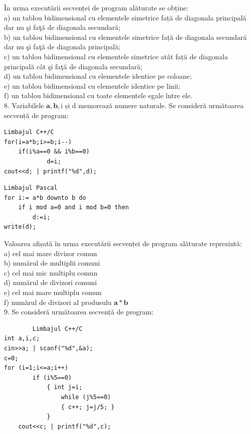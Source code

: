 \documentclass[10pt]{article}
\begin{document}
În urma executării secvenței de program alăturate se obține:\\
a) un tablou bidimensional cu elementele simetrice față de diagonala principală dar nu şi faţă de diagonala secundară;\\
b) un tablou bidimensional cu elementele simetrice față de diagonala secundară dar nu şi faţă de diagonala principală;\\
c) un tablou bidimensional cu elementele simetrice atât față de diagonala principală cât şi faţă de diagonala secundară;\\
d) un tablou bidimensional cu elementele identice pe coloane;\\
e) un tablou bidimensional cu elementele identice pe linii;\\
f) un tablou bidimensional cu toate elementele egale între ele.\\
8. Variabilele $\mathbf{a}, \mathbf{b}, \mathrm{i}$ și d memorează numere naturale. Se consideră următoarea secvență de program:

\begin{verbatim}
Limbajul C++/C
for(i=a*b;i>=b;i--)
    if(i%a==0 && i%b==0)
            d=i;
cout<<d; | printf("%d",d);
\end{verbatim}

\begin{verbatim}
Limbajul Pascal
for i:= a*b downto b do
    if i mod a=0 and i mod b=0 then
        d:=i;
write(d);
\end{verbatim}

Valoarea afișată în urma executării secvenței de program alăturate reprezintă:\\
a) cel mai mare divizor comun\\
b) numărul de multiplii comuni\\
c) cel mai mic multiplu comun\\
d) numărul de divizori comuni\\
e) cel mai mare multiplu comun\\
f) numărul de divizori al produsulu $\mathbf{a * b}$\\
9. Se consideră următoarea secvență de program:

\begin{verbatim}
        Limbajul C++/C
int a,i,c;
cin>>a; | scanf("%d",&a);
c=0;
for (i=1;i<=a;i++)
        if (i%5==0)
            { int j=i;
                while (j%5==0)
                { c++; j=j/5; }
            }
    cout<<c; | printf("%d",c);
\end{verbatim}
\end{document}
